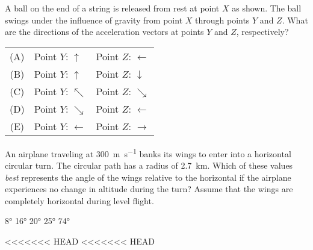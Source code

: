 \documentclass{../../oss-apphys-exam}
\begin{document}
\begin{multicols*}{2}
\begin{questions}
{{    

    \question A ball on the end of a string is released from rest at point $X$
    as shown. The ball swings under the influence of gravity from point $X$
    through points $Y$ and $Z$. What are the directions of the acceleration
    vectors at points $Y$ and $Z$, respectively?
    
    \begin{tabular}{cll}
      (A) & Point $Y$: {\LARGE $\uparrow$} & Point $Z$: {\LARGE $\leftarrow$}\\
      (B) & Point $Y$: {\LARGE $\uparrow$} & Point $Z$: {\LARGE $\downarrow$}\\
      (C) & Point $Y$: {\LARGE $\nwarrow$} & Point $Z$: {\LARGE $\searrow$}\\
      (D) & Point $Y$: {\LARGE $\searrow$} & Point $Z$: {\LARGE $\leftarrow$}\\
      (E) & Point $Y$: {\LARGE $\leftarrow$}&Point $Z$: {\LARGE $\rightarrow$}\\
    \end{tabular}
    \columnbreak

    \columnbreak
    
    \question An airplane traveling at \SI{300}{\metre\per\second} banks its
    wings to enter into a horizontal circular turn. The circular path has a
    radius of \SI{2.7}{\kilo\metre}. Which of these values \emph{best}
    represents the angle of the wings relative to the horizontal if the airplane
    experiences no change in altitude during the turn? Assume that the wings
    are completely horizontal during level flight.
    \begin{choices}
      \choice\ang{8}
      \choice\ang{16}
      \choice\ang{20}
      \choice\ang{25}
      \correctchoice\ang{74}
    \end{choices}
<<<<<<< HEAD
<<<<<<< HEAD
    
}}
\end{questions}
\end{multicols*}
\end{document}
